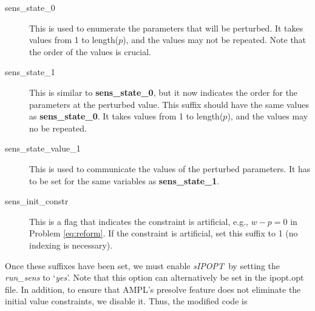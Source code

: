 \documentclass[letter, 11pt]{article}
\newcommand{\sensKKT}{\emph{sIPOPT}}
\newcommand{\AMPL}{AMPL}
\newcommand{\runaskkt}{run\_sens}
\newcommand{\statez}{sens\_state\_0}
\newcommand{\stateo}{sens\_state\_1}
\newcommand{\statevo}{sens\_state\_value\_1}
\newcommand{\initc}{sens\_init\_constr}
\begin{document}
\begin{description}
\item[\statez] This is used to enumerate the parameters that will be perturbed. It takes values from 1 to length($p$), and
                      the values may not be repeated. Note that the order of the values is crucial.
\item[\stateo] This is similar to \textbf{\statez}, but it now indicates the order for the parameters at the perturbed value.
                      This suffix should have the same values as \textbf{\statez}. It takes values from 1 to length($p$), and
                      the values may no be repeated.
\item[\statevo] This is used to communicate the values of the perturbed parameters.
                             It has to be set for the same variables as \textbf{\stateo}.
\item[\initc] This is a flag that indicates the constraint is artificial, e.g., $w - p=0$ in Problem \eqref{eq:reform}.
                          If the constraint is artificial, set this suffix to 1 (no indexing is necessary).
\end{description}

Once these suffixes have been set, we must enable \sensKKT\ by setting the \emph{\runaskkt} to `\emph{yes}'. Note that
this option can alternatively be set in the ipopt.opt file. In addition, to ensure that
\AMPL's presolve feature does not eliminate the initial value constraints, we disable it. Thus, the modified code is
\end{document}
